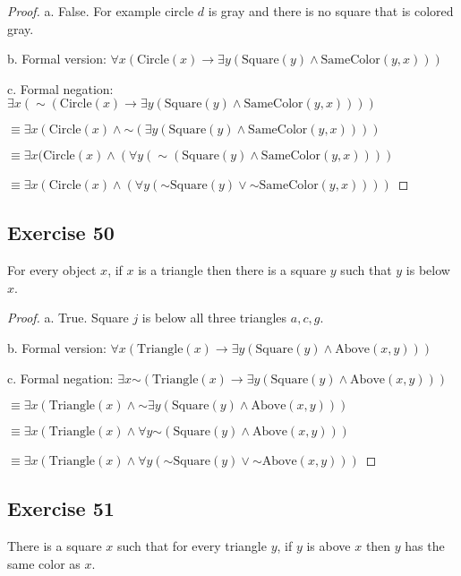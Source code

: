 \documentclass[14pt]{extarticle}
\newcommand{\fa}{\forall}
\newcommand{\te}{\exists}
\begin{document}
\begin{proof}
    a. False. For example circle $d$ is gray and there is no
    square that is colored gray.

    b. Formal version: $\fa x(\text{Circle}(x) \to \te y(\text{Square}(y) \wedge \text{SameColor}(y, x)))$

    c. Formal negation: $\te x({\sim (\text{Circle}(x) \to \te y(\text{Square}(y) \wedge \text{SameColor}(y, x)))})$

    $\equiv \te x(\text{Circle}(x) \wedge {\sim (\te y(\text{Square}(y) \wedge \text{SameColor}(y, x)))})$

    $\equiv \te x(\text{Circle}(x) \wedge (\fa y ({\sim (\text{Square}(y) \wedge \text{SameColor}(y, x))}))$

    $\equiv \te x(\text{Circle}(x) \wedge (\fa y ({\sim \text{Square}(y)} \vee {\sim \text{SameColor}(y, x)})))$
\end{proof}

\subsection{Exercise 50}
For every object $x$, if $x$ is a triangle then there is a square $y$ such that $y$ is below $x$.

\begin{proof}
    a. True. Square $j$ is below all three triangles $a, c, g$.

    b. Formal version: $\fa x(\text{Triangle}(x) \to \te y(\text{Square}(y) \wedge \text{Above}(x, y)))$

    c. Formal negation: $\te x {\sim(\text{Triangle}(x) \to \te y(\text{Square}(y) \wedge \text{Above}(x, y)))}$

    $\equiv \te x (\text{Triangle}(x) \wedge {\sim\te y(\text{Square}(y) \wedge \text{Above}(x, y))})$

    $\equiv \te x (\text{Triangle}(x) \wedge \fa y {\sim(\text{Square}(y) \wedge \text{Above}(x, y))})$

    $\equiv \te x (\text{Triangle}(x) \wedge \fa y ({\sim\text{Square}(y)} \vee {\sim\text{Above}(x, y)}))$
\end{proof}

\subsection{Exercise 51}
There is a square $x$ such that for every triangle $y$, if $y$ is above $x$ then $y$ has the same color as $x$.
\end{document}
